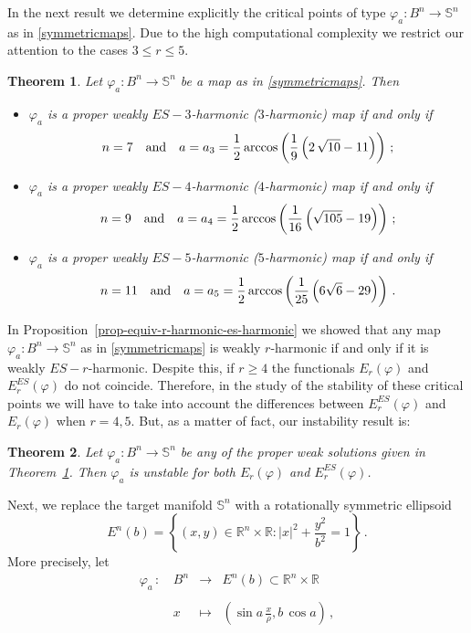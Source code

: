 \documentclass[11pt]{amsart}
\theoremstyle{plain}
\newtheorem{theorem}                {Theorem}      [section]
\theoremstyle{definition}
\numberwithin{equation}{section}
\def \R{{\mathbb R}}
\def \s{{\mathbb S}}
\numberwithin{equation}{section}
\begin{document}
In the next result we determine explicitly the critical points of type $\varphi_a:B^n \to \s^n$ as in \eqref{symmetricmaps}. Due to the  high computational complexity we restrict our attention to the cases $3\leq r\leq 5$. 

\begin{theorem}\label{th-constant-soltz} 
Let
$\varphi_a:B^n \to \s^n$ be a map as in \eqref{symmetricmaps}. Then 
\begin{itemize}
\item[(i)] $\varphi_a$ is a proper weakly $ES-3$-harmonic ($3$-harmonic) map if and only if
$$
n=7 \quad {\rm and} \quad a=a_3=\dfrac{1}{2} \arccos\left(\dfrac{1}{9} \left(2\,\sqrt{10}-11\right)\right) \,;
$$
\item[(ii)] $\varphi_a$ is a proper weakly $ES-4$-harmonic ($4$-harmonic) map if and only if
$$
n=9 \quad {\rm and} \quad a=a_4=\dfrac{1}{2} \arccos\left(\dfrac{1}{16} \left(\sqrt{105}-19\right)\right) \,;
$$
\item[(iii)] $\varphi_a$ is a proper weakly $ES-5$-harmonic ($5$-harmonic) map if and only if
$$
n=11 \quad {\rm and} \quad a=a_{5}=\dfrac{1}{2} \arccos\left(\dfrac{1}{25} \left(6\sqrt{6}-29\right)\right) \,.
$$
\end{itemize}
\end{theorem}
In Proposition~\ref{prop-equiv-r-harmonic-es-harmonic} we showed that any map $\varphi_a:B^n \to \s^n$  as in \eqref{symmetricmaps} is 
weakly $r$-harmonic if and only if it is weakly $ES-r$-harmonic. Despite this, if $r\geq 4$ the functionals  $E_r(\varphi)$ and $E^{ES}_r(\varphi)$ do not coincide. Therefore, in the study of the stability of these critical points we will have to take into account the differences between $E^{ES}_r(\varphi)$ and $E_r(\varphi)$ when $r=4,5$. But, as a matter of fact, our instability result is:
\begin{theorem}\label{r-stability-theorem} Let
$\varphi_a:B^n \to \s^n$ be any of the proper weak solutions given in Theorem~\ref{th-constant-soltz}. Then $\varphi_a$ is unstable for both $E_r(\varphi)$ and $E^{ES}_r(\varphi)$.
\end{theorem}
Next, we replace the target manifold $\s^n$ with a rotationally symmetric ellipsoid 
\[
E^n(b)=\left \{( x,y)\in \R^n \times \R \colon |x|^2+\frac{y^2}{b^2}=1\right \}\,.
\]
More precisely, let
\begin{equation}\label{symmetricmaps-ellipsoid}\begin{array}{lcll}
                                           \varphi_{a} \,:\, &B^n &\to &  E^n(b) \subset \R^n \times \R \\
                                           &&& \\
                                           &x &\mapsto & ( \sin a\,{\frac{x}{\rho}}, b\,\cos a) \, ,
                                         \end{array}
\end{equation}
\end{document}
